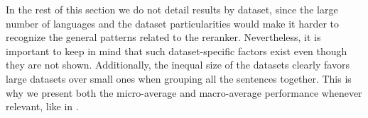 \documentclass[output=paper,modfonts,nonflat]{langsci/langscibook}
\begin{document}
\begin{table}
  \caption{{Reranker-specific performance by number of expressions
      in the gold sequence (all languages).} P/R/F stands for
    precision/recall/f-score; the macro-average performance is the
    average over languages (datasets with NaN F-scores are
    ignored).\label{tab:perfNbExprs}}
\end{table}



In the rest of this section we do not detail results by dataset, since
the large number of languages and the dataset particularities would
make it harder to recognize the general patterns related to the
reranker.
Nevertheless, it is important to keep in mind that such
dataset-specific factors exist even though they are not
shown. Additionally, the inequal size of the datasets clearly favors
large datasets over small ones when grouping all the sentences
together. This is why we present both the micro-average and
macro-average performance whenever relevant, like in .
\end{document}

